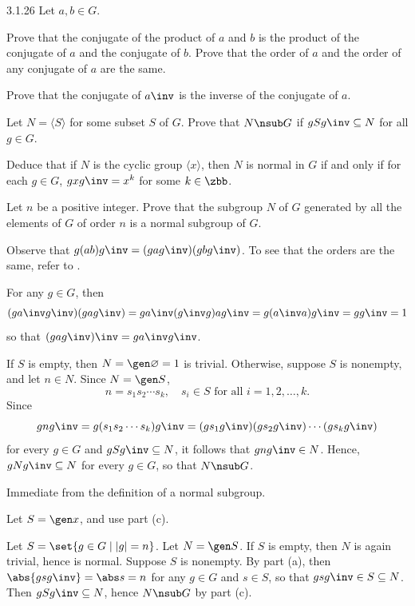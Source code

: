 \begin{exercise}{3.1.26} 
    Let $a,b \in G$.
    \begin{subexercises}
        \item Prove that the conjugate of the product of $a$ and $b$ is the product of the conjugate of $a$ and the conjugate of $b$.
	    Prove that the order of $a$ and the order of any conjugate of $a$ are the same.
        \item Prove that the conjugate of $a\inv $ is the inverse of the conjugate of $a$.
        \item Let $N = \langle S \rangle$ for some subset $S$ of $G$.
	    Prove that $N \nsub G$ if $gSg\inv  \subseteq N$ for all $g \in G$.
        \item Deduce that if $N$ is the cyclic group $\langle x \rangle$, then $N$ is normal in $G$ if and only if for each $g \in G$, $gxg\inv  = x^k$ for some $k \in \zbb$.
        \item Let $n$ be a positive integer.
	    Prove that the subgroup $N$ of $G$ generated by all the elements of $G$ of order $n$ is a normal subgroup of $G$.
    \end{subexercises}
\end{exercise}

\begin{solenum}
    \item Observe that $g(ab)g\inv = (gag\inv)(gbg\inv)$.
	To see that the orders are the same, refer to .
    \item For any $g \in G$, then
    \[
    	(ga\inv g\inv)(gag\inv) = ga\inv (g\inv g) ag\inv = g(a\inv a)g\inv = gg\inv = 1
    \]
    so that $(gag\inv)\inv = ga\inv g\inv$.
    \item If $S$ is empty, then $N = \gen\varnothing = 1$ is trivial.
	Otherwise, suppose $S$ is nonempty, and let $n \in N$.
	Since $N = \gen S$,
    \[
    	n = s_1s_2 \cdots s_k, \quad s_i \in S \text{ for all } i = 1, 2, \ldots, k.
    \]
    Since
    \[
        gng\inv = g(s_1s_2 \cdots s_k)g\inv = (gs_1g\inv)(gs_2g\inv) \cdots (gs_kg\inv)
    \]
    for every $g \in G$ and $gSg\inv \subseteq N$, it follows that $gng\inv \in N$.
    Hence, $gNg\inv \subseteq N$ for every $g \in G$, so that $N \nsub G$.
    \item \rightimp Immediate from the definition of a normal subgroup.

    \leftimp Let $S = \gen x$, and use part (c).
    \item Let $S = \set{g \in G \mid |g| = n}$.
	Let $N = \gen S$.
	If $S$ is empty, then $N$ is again trivial, hence is normal.
	Suppose $S$ is nonempty.
	By part (a), then $\abs{gsg\inv} = \abs s = n$ for any $g \in G$ and $s \in S$, so that $gsg\inv \in S \subseteq N$.
	Then $gSg\inv \subseteq N$, hence $N \nsub G$ by part (c).
\end{solenum}

